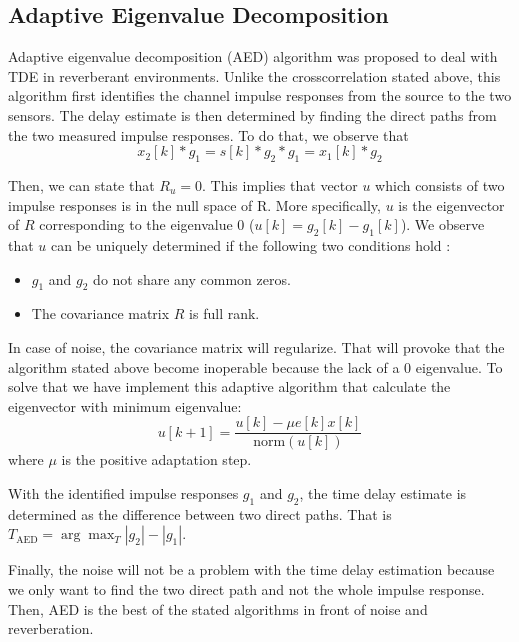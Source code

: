 \subsection{Adaptive Eigenvalue Decomposition}
Adaptive eigenvalue decomposition (AED) algorithm was proposed to deal with TDE in reverberant environments. Unlike the crosscorrelation stated above, this algorithm first identifies the channel impulse responses from the source to the two sensors. The delay estimate is then determined by finding the direct paths from the two measured impulse responses. To do that, we observe that
  $$x_2[k] * g_1 = s[k] * g_2 * g_1 = x_1[k] * g_2$$
  
  Then, we can state that $R_u = 0$. This implies that vector $u$ which consists of two impulse responses is in the null space of R. More specifically, $u$ is the eigenvector of $R$ corresponding to the eigenvalue 0 ($u[k]=g_2[k] - g_1[k]$). We observe that $u$ can be uniquely determined if the following two conditions hold \cite{overview, aed}:
\begin{itemize}
  \item $g_1$ and $g_2$ do not share any common zeros.
  \item The covariance matrix $R$ is full rank.
\end{itemize}

  In case of noise, the covariance matrix will regularize. That will provoke that the algorithm stated above become inoperable because the lack of a 0 eigenvalue. To solve that we have implement this adaptive algorithm that calculate the eigenvector with minimum eigenvalue:
 $$u[k+1] = \frac{u[k] - \mu e[k] x[k]}{\text{norm}(u[k])}$$   where $\mu$ is the positive adaptation step.
 

  With the identified impulse responses $g_1$ and $g_2$, the time delay estimate is determined as the difference between two direct paths. That is $T_{\text{AED}} = \arg\max_T |g_2|-|g_1|$. 

  Finally, the noise will not be a problem with the time delay estimation because we only want to find the two direct path and not the whole impulse response. Then, AED is the best of the stated algorithms in front of noise and reverberation. 
